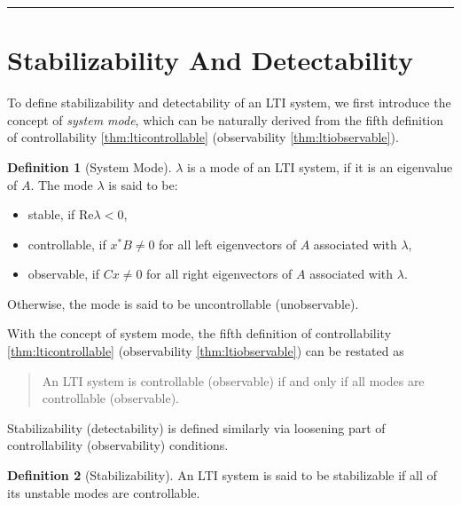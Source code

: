 \documentclass[
]{book}
\providecommand{\tightlist}{%
  \setlength{\itemsep}{0pt}\setlength{\parskip}{0pt}}
\theoremstyle{definition}
\newtheorem{definition}{Definition}[chapter]
\theoremstyle{definition}
\theoremstyle{definition}
\theoremstyle{definition}
\theoremstyle{remark}
\begin{document}
\begin{center}\rule{0.5\linewidth}{0.5pt}\end{center}

\hypertarget{stabilizability-and-detectability}{%
\section{Stabilizability And Detectability}\label{stabilizability-and-detectability}}

To define stabilizability and detectability of an LTI system, we first introduce the concept of \emph{system mode}, which can be naturally derived from the fifth definition of controllability \ref{thm:lticontrollable} (observability \ref{thm:ltiobservable}).

\begin{definition}[System Mode]
\protect\hypertarget{def:ltisystemmode}{}\label{def:ltisystemmode}\(\lambda\) is a mode of an LTI system, if it is an eigenvalue of \(A\). The mode \(\lambda\) is said to be:

\begin{itemize}
\tightlist
\item
  stable, if \(\text{Re}\lambda < 0\),
\item
  controllable, if \(x^* B \ne 0\) for all left eigenvectors of \(A\) associated with \(\lambda\),
\item
  observable, if \(C x \ne 0\) for all right eigenvectors of \(A\) associated with \(\lambda\).
\end{itemize}

Otherwise, the mode is said to be uncontrollable (unobservable).
\end{definition}

With the concept of system mode, the fifth definition of controllability \ref{thm:lticontrollable} (observability \ref{thm:ltiobservable}) can be restated as

\begin{quote}
An LTI system is controllable (observable) if and only if all modes are controllable (observable).
\end{quote}

Stabilizability (detectability) is defined similarly via loosening part of controllability (observability) conditions.

\begin{definition}[Stabilizability]
\protect\hypertarget{def:ltistabilizable}{}\label{def:ltistabilizable}An LTI system is said to be stabilizable if all of its unstable modes are controllable.
\end{definition}
\end{document}
